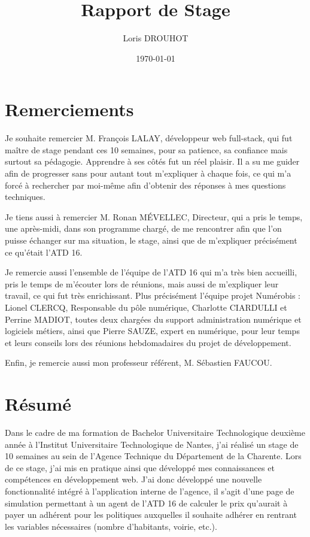 \documentclass[a4paper,12pt]{report}
\title{Rapport de Stage}
\author{Loris DROUHOT}
\date{\today}
\begin{document}
\maketitle
\newpage
\thispagestyle{empty}

\chapter*{Remerciements}

Je souhaite remercier M. François LALAY, développeur web full-stack, qui fut maître de stage pendant ces 10 semaines, pour sa patience, sa confiance mais surtout sa pédagogie. Apprendre à ses côtés fut un réel plaisir. Il a su me guider afin de progresser sans pour autant tout m'expliquer à chaque fois, ce qui m’a forcé à rechercher par moi-même afin d’obtenir des réponses à mes questions techniques.

\vspace{1em}

Je tiens aussi à remercier M. Ronan MÉVELLEC, Directeur, qui a pris le temps, une après-midi, dans son programme chargé, de me rencontrer afin que l’on puisse échanger sur ma situation, le stage, ainsi que de m’expliquer précisément ce qu’était l’ATD 16.

\vspace{1em}

Je remercie aussi l’ensemble de l’équipe de l’ATD 16 qui m’a très bien accueilli, pris le temps de m’écouter lors de réunions, mais aussi de m’expliquer leur travail, ce qui fut très enrichissant. Plus précisément l'équipe projet Numérobis : Lionel CLERCQ, Responsable du pôle numérique, Charlotte CIARDULLI et Perrine MADIOT, toutes deux chargées du support administration numérique et logiciels métiers, ainsi que Pierre SAUZE, expert en numérique, pour leur temps et leurs conseils lors des réunions hebdomadaires du projet de développement.

\vspace{1em}

Enfin, je remercie aussi mon professeur référent, M. Sébastien FAUCOU.

\newpage
\chapter*{Résumé}
\thispagestyle{empty}

Dans le cadre de ma formation de Bachelor Universitaire Technologique deuxième année à l’Institut Universitaire Technologique de Nantes, j’ai réalisé un stage de 10 semaines au sein de l’Agence Technique du Département de la Charente. Lors de ce stage, j’ai mis en pratique ainsi que développé mes connaissances et compétences en développement web. J’ai donc développé une nouvelle fonctionnalité intégré à l'application interne de l’agence, il s'agit d'une page de simulation permettant à un agent de l'ATD 16 de calculer le prix qu’aurait à payer un adhérent pour les politiques auxquelles il souhaite adhérer en rentrant les variables nécessaires (nombre d’habitants, voirie, etc.).
\end{document}
